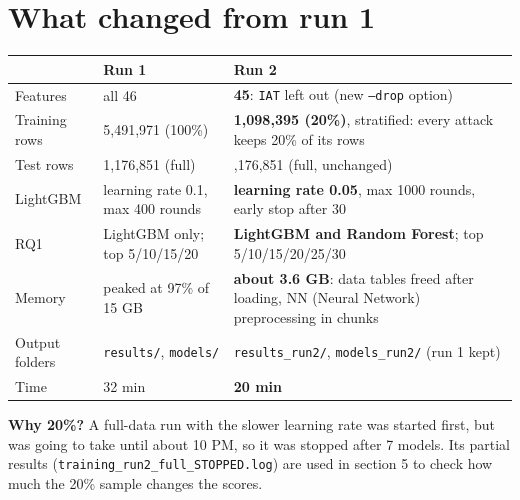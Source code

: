 \documentclass[11pt]{article}
\begin{document}
\section{What changed from run 1}
\begin{longtable}{@{}>{\raggedright}p{4cm} >{\raggedright}p{5.4cm} >{\raggedright\arraybackslash}p{6.4cm}@{}}
\toprule
& \textbf{Run 1} & \textbf{Run 2} \\
\midrule
\endhead
Features & all 46 & \textbf{45}: \texttt{IAT} left out (new \texttt{--drop} option) \\
Training rows & 5,491,971 (100\%) & \textbf{1,098,395 (20\%)}, stratified: every attack keeps 20\% of its rows \\
Test rows & 1,176,851 (full) & 1,176,851 (full, unchanged) \\
LightGBM & learning rate 0.1, max 400 rounds & \textbf{learning rate 0.05}, max 1000 rounds, early stop after 30 \\
RQ1 & LightGBM only; top 5/10/15/20 & \textbf{LightGBM and Random Forest}; top 5/10/15/20/25/30 \\
Memory & peaked at 97\% of 15 GB & \textbf{about 3.6 GB}: data tables freed after loading, NN (Neural Network) preprocessing in chunks \\
Output folders & \texttt{results/}, \texttt{models/} & \texttt{results\_run2/}, \texttt{models\_run2/} (run 1 kept) \\
Time & 32 min & \textbf{20 min} \\
\bottomrule
\end{longtable}

\textbf{Why 20\%?} A full-data run with the slower learning rate was started first, but was going to take until about 10 PM, so it was stopped after 7 models.
Its partial results (\texttt{training\_run2\_full\_STOPPED.log}) are used in section 5 to check how much the 20\% sample changes the scores.

\newpage
\end{document}
